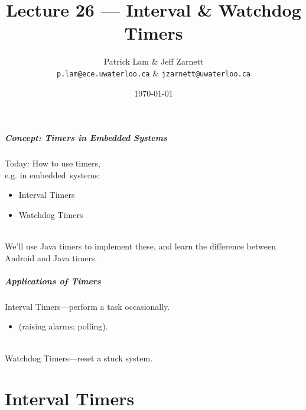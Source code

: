 

\title{Lecture 26 --- Interval \& Watchdog Timers}

\author{Patrick Lam \& Jeff Zarnett\\ \small \texttt{p.lam@ece.uwaterloo.ca} \& \texttt{jzarnett@uwaterloo.ca}}
\date{\today}



\begin{frame}
  \titlepage
\end{frame}


\begin{frame}
\frametitle{Concept: Timers in Embedded Systems}

\begin{changemargin}{1cm}
\large

Today: How to use timers,\\ \qquad \qquad e.g. in embedded~systems:
\begin{itemize}
\item Interval Timers
\item Watchdog Timers
\end{itemize}
~\\
We'll use Java timers to implement these,
and learn the difference between Android and Java timers.

\end{changemargin}

\end{frame}

\begin{frame}
\frametitle{Applications of Timers}

\Large
\begin{changemargin}{1.3cm}
Interval Timers---perform a task occasionally.\\[-0.5em]
\begin{itemize}\item (raising alarms; polling).
\end{itemize}
~\\
Watchdog Timers---reset a stuck system.
~\\[1em]

\end{changemargin}

\end{frame}

\part{Interval Timers}
\frame{\partpage}

